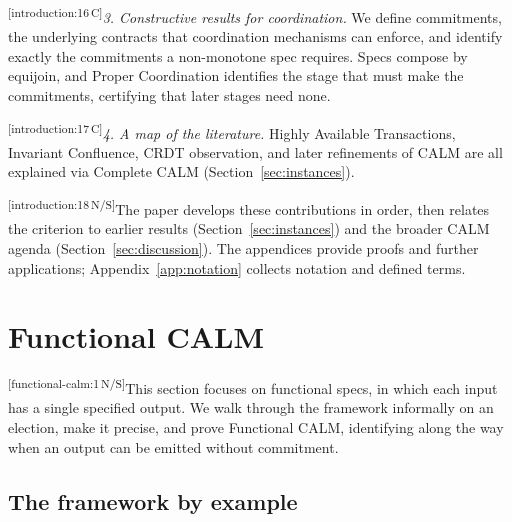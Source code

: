 \documentclass[sigconf]{cidr-2027}
\theoremstyle{remark}
\newcommand{\commitment}{commitment\xspace}
\newcommand{\commitments}{commitments\xspace}
\newcommand{\cxtag}[2]{\textsuperscript{\textsf{\tiny[#1\,#2]}}}
\begin{document}
\color{black!45}\noindent
\cxtag{introduction:16}{C}\emph{3. Constructive results for coordination.} We define \commitments,
        the underlying contracts that coordination mechanisms can enforce,
        and identify exactly the \commitments a non-monotone spec requires.
        Specs compose by equijoin, and Proper Coordination identifies the stage
        that must make the \commitments, certifying that later stages need
        none.\color{black}

\color{black!45}\noindent
\cxtag{introduction:17}{C}\emph{4. A map of the literature.} Highly Available Transactions, Invariant
        Confluence, CRDT observation, and later refinements of CALM are all
        explained via Complete CALM (Section~\ref{sec:instances}).\color{black}

\color{black}\vspace{0.5em}
\noindent
\cxtag{introduction:18}{N/S}The paper develops these contributions in order, then relates the criterion to
earlier results (Section~\ref{sec:instances}) and the broader CALM agenda
(Section~\ref{sec:discussion}).  The appendices provide proofs and further
applications; Appendix~\ref{app:notation} collects notation and defined terms.\color{black}

\section{Functional CALM}
\label{sec:functional-calm}

\color{black}\cxtag{functional-calm:1}{N/S}This section focuses on functional specs, in which each input has a
single specified output.  We walk through the framework informally on an
election, make it precise, and prove Functional CALM, identifying along the
way when an output can be emitted without \commitment.\color{black}

\subsection{The framework by example}
\label{sec:election-story}
\end{document}
